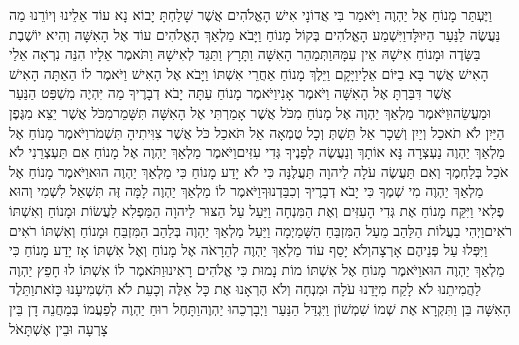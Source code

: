 \documentclass[../main/main.tex]{subfiles}
\begin{document}
\begin{multicols*}{\ncols}
וַיֶּעְתַּר מָנוֹחַ אֶל יַהְוֶה וַיֹּאמַר בִּי אֲדוֹנָי אִישׁ הָאֱלֹהִים אֲשֶׁר שָׁלַחְתָּ יָבוֹא נָא עוֹד אֵלֵינוּ וְיוֹרֵנוּ מַה נַּעֲשֶׂה לַנַּעַר הַיּוּלָּד\PreVerseSpace{}וַיִּשְׁמַע הָאֱלֹהִים בְּקוֹל מָנוֹחַ וַיָּבֹא מַלְאַךְ הָאֱלֹהִים עוֹד אֶל הָאִשָּׁה וְהִיא יוֹשֶׁבֶת בַּשָּׂדֶה וּמָנוֹחַ אִישָׁהּ אֵין עִמָּהּ\PreVerseSpace{}וַתְּמַהֵר הָאִשָּׁה וַתָּרָץ וַתַּגֵּד לְאִישָׁהּ וַתֹּאמֶר אֵלָיו הִנֵּה נִרְאָה אֵלַי הָאִישׁ אֲשֶׁר בָּא בַיּוֹם אֵלָי\PreVerseSpace{}וַיָּקָם וַיֵּלֶךְ מָנוֹחַ אַחֲרֵי אִשְׁתּוֹ וַיָּבֹא אֶל הָאִישׁ וַיֹּאמֶר לוֹ הַאַתָּה הָאִישׁ אֲשֶׁר דִּבַּרְתָּ אֶל הָאִשָּׁה וַיֹּאמֶר אָנִי\PreVerseSpace{}וַיֹּאמֶר מָנוֹחַ עַתָּה יָבֹא דְבָרֶיךָ מַה יִּהְיֶה מִשְׁפַּט הַנַּעַר וּמַעֲשֵׂהוּ\PreVerseSpace{}וַיֹּאמֶר מַלְאַךְ יַהְוֶה אֶל מָנוֹחַ מִכֹּל אֲשֶׁר אָמַרְתִּי אֶל הָאִשָּׁה תִּשָּׁמֵר\PreVerseSpace{}מִכֹּל אֲשֶׁר יֵצֵא מִגֶּפֶן הַיַּיִן לֹא תֹאכַל וְיַיִן וְשֵׁכָר אַל תֵּשְׁתְּ וְכָל טֻמְאָה אַל תֹּאכַל כֹּל אֲשֶׁר צִוִּיתִיהָ תִּשְׁמֹר\PreVerseSpace{}וַיֹּאמֶר מָנוֹחַ אֶל מַלְאַךְ יַהְוֶה נַעְצְרָה נָּא אוֹתָךְ וְנַעֲשֶׂה לְפָנֶיךָ גְּדִי עִזִּים\PreVerseSpace{}וַיֹּאמֶר מַלְאַךְ יַהְוֶה אֶל מָנוֹחַ אִם תַּעְצְרֵנִי לֹא אֹכַל בְּלַחְמֶךָ וְאִם תַּעֲשֶׂה עֹלָה לַיהוָה תַּעֲלֶנָּה כִּי לֹא יָדַע מָנוֹחַ כִּי מַלְאַךְ יַהְוֶה הוּא\PreVerseSpace{}וַיֹּאמֶר מָנוֹחַ אֶל מַלְאַךְ יַהְוֶה מִי שְׁמֶךָ כִּי יָבֹא דְבָרֶיךָ וְכִבַּדְנוּךָ\PreVerseSpace{}וַיֹּאמֶר לוֹ מַלְאַךְ יַהְוֶה לָמָּה זֶּה תִּשְׁאַל לִשְׁמִי וְהוּא פֶלִאי \ClosedSection{}וַיִּקַּח מָנוֹחַ אֶת גְּדִי הָעִזִּים וְאֶת הַמִּנְחָה וַיַּעַל עַל הַצּוּר לַיהוָה הַמַּפְלִא\SubEnd{} לַעֲשׂוֹת וּמָנוֹחַ וְאִשְׁתּוֹ רֹאִים\PreVerseSpace{}וַיְהִי בַעֲלוֹת הַלַּהַב מֵעַל הַמִּזְבֵּחַ הַשָּׁמַיְמָה וַיַּעַל מַלְאַךְ יַהְוֶה בְּלַהַב הַמִּזְבֵּחַ וּמָנוֹחַ וְאִשְׁתּוֹ רֹאִים וַיִּפְּלוּ עַל פְּנֵיהֶם אָרְצָה\PreVerseSpace{}וְלֹא יָסַף עוֹד מַלְאַךְ יַהְוֶה לְהֵרָאֹה אֶל מָנוֹחַ וְאֶל אִשְׁתּוֹ אָז יָדַע מָנוֹחַ כִּי מַלְאַךְ יַהְוֶה הוּא\PreVerseSpace{}וַיֹּאמֶר מָנוֹחַ אֶל אִשְׁתּוֹ מוֹת נָמוּת כִּי אֱלֹהִים רָאִינוּ\PreVerseSpace{}וַתֹּאמֶר לוֹ אִשְׁתּוֹ לוּ חָפֵץ יַהְוֶה לַהֲמִיתֵנוּ לֹא לָקַח מִיָּדֵנוּ עֹלָה וּמִנְחָה וְלֹא הֶרְאָנוּ אֶת כָּל אֵלֶּה וְכָעֵת לֹא הִשְׁמִיעָנוּ כָּזֹאת\PreVerseSpace{}וַתֵּלֶד הָאִשָּׁה בֵּן וַתִּקְרָא אֶת שְׁמוֹ שִׁמְשׁוֹן וַיִּגְדַּל הַנַּעַר וַיְבָרְכֵהוּ יַהְוֶה\PreVerseSpace{}וַתָּחֶל רוּחַ יַהְוֶה לְפַעֲמוֹ בְּמַחֲנֵה דָן בֵּין צָרְעָה וּבֵין אֶשְׁתָּאֹל\OpenSection{}\par

\end{multicols*}
\end{document}
